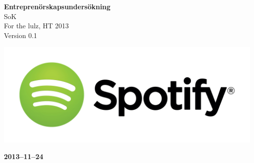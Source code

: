 \documentclass[pdftex, fontsize=11pt, a4paper]{scrbook}
\begin{document}
\begin{titlepage}
\thispagestyle{empty}
\begin{center}
	\vspace*{4\baselineskip}

	\textbf{\huge Entreprenörskapsundersökning} \\
	\vspace*{0.5\baselineskip}
	{\large  SoK} \\
	\vspace*{0.5\baselineskip}
	{\large  For the lulz, HT 2013} \\
	\vspace*{0.5\baselineskip}
	{\large  Version 0.1}


	\vspace*{6\baselineskip}
	\includegraphics[width=\linewidth]{SpotifyLogo}


	\normalfont
	\small
	\vfill


	\vspace*{2\baselineskip}

	\textbf{2013--11--24} \\
	[2\baselineskip]
\end{center}

\end{titlepage}
\end{document}
